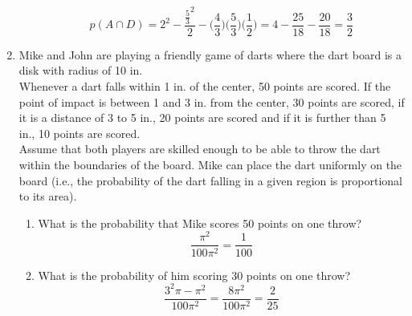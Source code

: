 \documentclass[10.5pt,letterpaper]{article}
\begin{document}
\begin{enumerate}[label=\textbf{Problem \arabic*.}]
\begin{enumerate}[label=$\Alph*$:]
\begin{center}
\end{center}
\[p(A \cap D) = 2^2 - \frac{\frac{5}{3}^2}{2} - \bigg(\frac{4}{3}\bigg)\bigg(\frac{5}{3}\bigg)\bigg(\frac{1}{2}\bigg) = 4-\frac{25}{18}-\frac{20}{18}=\frac{3}{2}\]
	\end{enumerate}
\item Mike and John are playing a friendly game of darts where the dart board is a disk with radius of 10 in.\\
Whenever a dart falls within 1 in. of the center, 50 points are scored. If the point of impact is between 1 and 3 in. from the center, 30 points are scored, if it is a distance of 3 to 5 in., 20 points are scored and if it is further than 5 in., 10 points are scored.\\
Assume that both players are skilled enough to be able to throw the dart within the boundaries of the board. Mike can place the dart uniformly on the board (i.e., the probability of the dart falling in a given region is proportional to its area).
	\begin{enumerate}[label=\alph*)]
\item What is the probability that Mike scores 50 points on one throw?
\[\frac{\pi^2}{100\pi^2}=\frac{1}{100}\]
\item What is the probability of him scoring 30 points on one throw?
\[\frac{3^2\pi-\pi^2}{100\pi^2}=\frac{8\pi^2}{100\pi^2}=\frac{2}{25}\]
	\end{enumerate}
\end{enumerate}
\pagebreak

\end{document}
